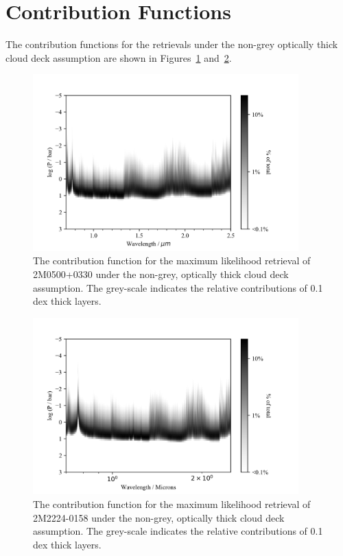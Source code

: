 \documentclass[useAMS,usenatbib]{mn2e}
\begin{document}
\section{Contribution Functions}
\label{sec:cont}
The contribution functions for the retrievals under the non-grey optically thick cloud deck assumption are shown in Figures~\ref{fig:2m0500cont} and~\ref{fig:2m2224cont}.

\begin{figure}
\hspace{-0.8cm}\includegraphics[width=290pt]{2M0500_thickPow_contribution_ucl.png}
\caption{ The contribution function for the maximum likelihood retrieval of 2M0500+0330 under the non-grey, optically thick cloud deck assumption. The grey-scale indicates the relative contributions of 0.1 dex thick layers.  
\label{fig:2m0500cont}}
\end{figure}
 
\begin{figure}
\hspace{-0.8cm}\includegraphics[width=290pt]{2M2224_thickPow_contribution_ucl.png}
\caption{ The contribution function for the maximum likelihood retrieval of 2M2224-0158 under the non-grey, optically thick cloud deck assumption. The grey-scale indicates the relative contributions of 0.1 dex thick layers.  
\label{fig:2m2224cont}}
\end{figure}
 
\end{document}
